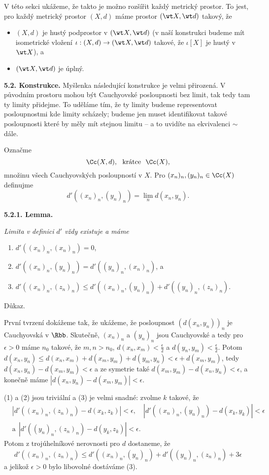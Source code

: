 \documentclass[12pt]{article}
\begin{document}
 V této sekci ukážeme, že takto je možno rozšířit každý metrický prostor. To jest, pro každý metrický prostor $(X,d)$ máme prostor $(\wt X,\wt d)$
 takový, že
 \begin{itemize}
 \item $(X,d)$ je hustý podprostor v $(\wt X,\wt d)$ (v naší konstrukci budeme mít isometrické vložení $\iota:(X,d)\to(\wt X,\wt d)$
 takové, že $\iota[X]$ je hustý v $\wt X$), a
  \item  $(\wt X,\wt d)$ je úplný.
  \end{itemize}
  
  \bigskip
  
  {\bf 5.2. Konstrukce.} Myšlenka následující konstrukce je velmi přirozená. V původním prostoru mohou být Cauchyovské posloupnosti bez limit, tak tedy tam ty limity přidejme. To uděláme tím, že ty limity budeme representovat posloupnostmi kde limity scházely; budeme jen muset identifikovat takové posloupnosti které by měly mít stejnou limitu  -- a to uvidíte na ekvivalenci $\sim$ dále.
  
  \medskip
  
 Ozna\v cme
  $$
  \Cc(X,d), \ \ \text{krátce}\ \ \Cc(X),
  $$
  množinu všech Cauchyovských posloupností v $X$. Pro $(x_n)_n,(y_n)_n\in\Cc(X)$ definujme
  $$
  d'((x_n)_n,(y_n)_n)=\lim_nd(x_n,y_n).
  $$
  
  \medskip
  
  {\bf 5.2.1. Lemma.} {\em Limita v definici $d'$ vždy existuje a máme
  \begin{enumerate}
  \item $d'((x_n)_n,(x_n)_n)=0$,
  \item $d'((x_n)_n,(y_n)_n)=d'((y_n)_n,(x_n)_n)$, a
  \item $d'((x_n)_n,(z_n)_n)\leq d'((x_n)_n,(y_n)_n)+d'((y_n)_n,(z_n)_n)$.
  \end{enumerate}
  
  Důkaz.} První tvrzení dokážeme tak, že ukážeme, že posloupnost
$(d(x_n,y_n))_n$ je Cauchyovská v $\Rbb$. Skutečně, $(x_n)_n$ a $(y_n)_n$ jsou Cauchyovské a tedy pro $\epsilon>0$ máme $n_0$ takové, že $m,n>n_0$, $d(x_n,x_m)<\frac{\epsilon}{2}$ a $d(y_n,y_m)<\frac{\epsilon}{2}$. Potom $d(x_n,y_n)\leq d(x_n,x_m)+d(x_m,y_m)+ d(y_m,y_n)<\epsilon+d(x_m,y_m)$, tedy
$d(x_n,y_n)-d(x_m,y_m)<\epsilon$ a ze symetrie také
$d(x_m,y_m)-d(x_n,y_n)<\epsilon$, a konečně máme
$|d(x_n,y_n)-d(x_m,y_m)|<\epsilon$.

(1) a (2) jsou triviální a (3) je velmi snadné: zvolme $k$ takové, že 
$$
\begin{aligned}
&|d'((x_n)_n,(z_n)_n)-d(x_k,z_k)|<\epsilon,\quad
|d'((x_n)_n,(y_n)_n)-d(x_k,y_k)|<\epsilon \\
&\text{a} \ \ |d'((y_n)_n,(z_n)_n)-d(y_k,z_k)|<\epsilon.
\end{aligned}
$$
 Potom z trojúhelníkové nerovnosti pro $d$ dostaneme, že
$$
d'((x_n)_n,(z_n)_n)\leq d'((x_n)_n,(y_n)_n)+d'((y_n)_n,(z_n)_n)+3\epsilon
$$
a jelikož $\epsilon>0$ bylo libovolné dostáváme (3). \sq
\end{document}
